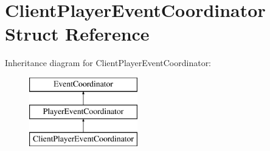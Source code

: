 \hypertarget{struct_client_player_event_coordinator}{}\section{Client\+Player\+Event\+Coordinator Struct Reference}
\label{struct_client_player_event_coordinator}
Inheritance diagram for Client\+Player\+Event\+Coordinator\+:\begin{figure}[H]
\begin{center}
\leavevmode
\includegraphics[height=3.000000cm]{struct_client_player_event_coordinator}
\end{center}
\end{figure}
